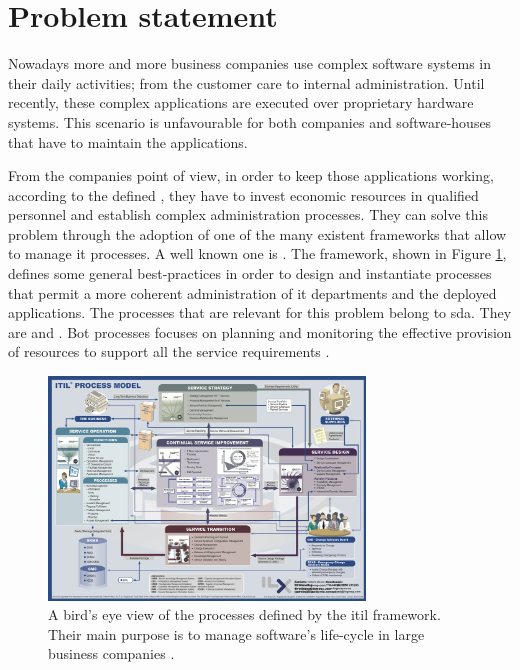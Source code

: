 %
%
\section{Problem statement}
\label{sec:background-problem}
Nowadays more and more business companies use complex software systems in their daily activities;
from the customer care to internal administration. Until recently, these complex applications are
executed over proprietary hardware systems. This scenario is unfavourable for both companies and
software-houses that have to maintain the applications.

From the companies point of view, in order to keep those applications working, according
to the defined , they have to invest economic resources in qualified personnel and 
establish complex administration processes. They can solve this problem through the adoption of 
one of the many existent frameworks that allow to manage \acs{it} processes. A well known one is
. The framework, shown in Figure \ref{img:background-problem-itilProcessModel}, 
defines some general best-practices in order to design and instantiate processes that permit a more
coherent administration of \acs{it} departments and the deployed applications. The processes that are
relevant for this problem belong to \ac{sda}. They are   and . Bot
processes focuses on planning and monitoring the effective provision of resources to support all the
service requirements \cite{availabilityCapacityProcesses}.

\begin{figure}
	\centering{}
	\includegraphics[width=0.75\textwidth]{chapters/background/images/itil-map.png}
	\caption[\acs{itil} v3 process model]{A bird's eye view of the processes defined by the \acf{itil} 
		framework. Their main purpose is to manage software's life-cycle in large business companies
		\cite{itilProcessModel}.}
	\label{img:background-problem-itilProcessModel}
\end{figure}

